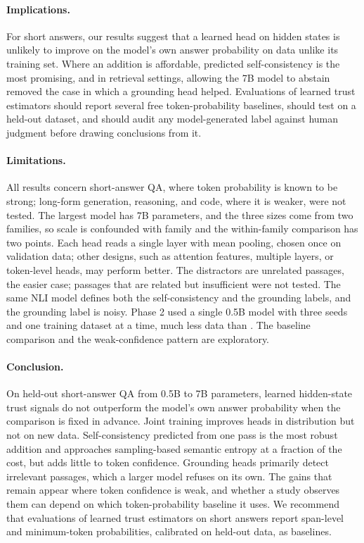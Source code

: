 \documentclass[10pt]{article}
\begin{document}
\paragraph{Implications.} For short answers, our results suggest that a learned head on hidden states is unlikely to improve on the model's own answer probability on data unlike its training set. Where an addition is affordable, predicted self-consistency is the most promising, and in retrieval settings, allowing the 7B model to abstain removed the case in which a grounding head helped. Evaluations of learned trust estimators should report several free token-probability baselines, should test on a held-out dataset, and should audit any model-generated label against human judgment before drawing conclusions from it.

\paragraph{Limitations.} All results concern short-answer QA, where token probability is known to be strong; long-form generation, reasoning, and code, where it is weaker, were not tested. The largest model has 7B parameters, and the three sizes come from two families, so scale is confounded with family and the within-family comparison has two points. Each head reads a single layer with mean pooling, chosen once on validation data; other designs, such as attention features, multiple layers, or token-level heads, may perform better. The distractors are unrelated passages, the easier case; passages that are related but insufficient were not tested. The same NLI model defines both the self-consistency and the grounding labels, and the grounding label is noisy. Phase 2 used a single 0.5B model with three seeds and one training dataset at a time, much less data than \citet{kapoor2024large}. The baseline comparison and the weak-confidence pattern are exploratory.

\paragraph{Conclusion.} On held-out short-answer QA from 0.5B to 7B parameters, learned hidden-state trust signals do not outperform the model's own answer probability when the comparison is fixed in advance. Joint training improves heads in distribution but not on new data. Self-consistency predicted from one pass is the most robust addition and approaches sampling-based semantic entropy at a fraction of the cost, but adds little to token confidence. Grounding heads primarily detect irrelevant passages, which a larger model refuses on its own. The gains that remain appear where token confidence is weak, and whether a study observes them can depend on which token-probability baseline it uses. We recommend that evaluations of learned trust estimators on short answers report span-level and minimum-token probabilities, calibrated on held-out data, as baselines.
\end{document}
